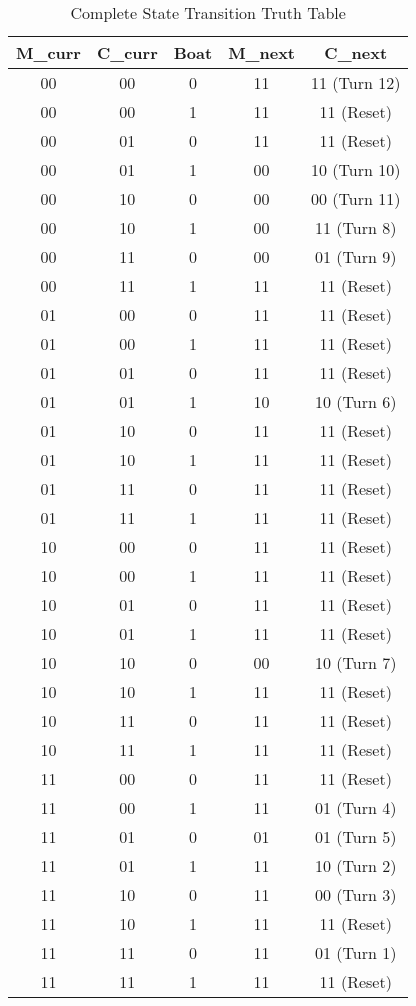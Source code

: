 \documentclass[10pt,a4paper]{article}
\begin{document}
\begin{table}[H]
\centering
\caption{Complete State Transition Truth Table}
\begin{tabular}{|c|c|c||c|c|}
\hline
\textbf{M\_curr} & \textbf{C\_curr} & \textbf{Boat} & \textbf{M\_next} & \textbf{C\_next} \\ \hline
00 & 00 & 0 & 11 & 11 \quad (Turn 12) \\ \hline
00 & 00 & 1 & 11 & 11 \quad (Reset) \\ \hline
00 & 01 & 0 & 11 & 11 \quad (Reset) \\ \hline
00 & 01 & 1 & 00 & 10 \quad (Turn 10) \\ \hline
00 & 10 & 0 & 00 & 00 \quad (Turn 11) \\ \hline
00 & 10 & 1 & 00 & 11 \quad (Turn 8) \\ \hline
00 & 11 & 0 & 00 & 01 \quad (Turn 9) \\ \hline
00 & 11 & 1 & 11 & 11 \quad (Reset) \\ \hline
01 & 00 & 0 & 11 & 11 \quad (Reset) \\ \hline
01 & 00 & 1 & 11 & 11 \quad (Reset) \\ \hline
01 & 01 & 0 & 11 & 11 \quad (Reset) \\ \hline
01 & 01 & 1 & 10 & 10 \quad (Turn 6) \\ \hline
01 & 10 & 0 & 11 & 11 \quad (Reset) \\ \hline
01 & 10 & 1 & 11 & 11 \quad (Reset) \\ \hline
01 & 11 & 0 & 11 & 11 \quad (Reset) \\ \hline
01 & 11 & 1 & 11 & 11 \quad (Reset) \\ \hline
10 & 00 & 0 & 11 & 11 \quad (Reset) \\ \hline
10 & 00 & 1 & 11 & 11 \quad (Reset) \\ \hline
10 & 01 & 0 & 11 & 11 \quad (Reset) \\ \hline
10 & 01 & 1 & 11 & 11 \quad (Reset) \\ \hline
10 & 10 & 0 & 00 & 10 \quad (Turn 7) \\ \hline
10 & 10 & 1 & 11 & 11 \quad (Reset) \\ \hline
10 & 11 & 0 & 11 & 11 \quad (Reset) \\ \hline
10 & 11 & 1 & 11 & 11 \quad (Reset) \\ \hline
11 & 00 & 0 & 11 & 11 \quad (Reset) \\ \hline
11 & 00 & 1 & 11 & 01 \quad (Turn 4) \\ \hline
11 & 01 & 0 & 01 & 01 \quad (Turn 5) \\ \hline
11 & 01 & 1 & 11 & 10 \quad (Turn 2) \\ \hline
11 & 10 & 0 & 11 & 00 \quad (Turn 3) \\ \hline
11 & 10 & 1 & 11 & 11 \quad (Reset) \\ \hline
11 & 11 & 0 & 11 & 01 \quad (Turn 1) \\ \hline
11 & 11 & 1 & 11 & 11 \quad (Reset) \\ \hline
\end{tabular}
\end{table}
\end{document}
